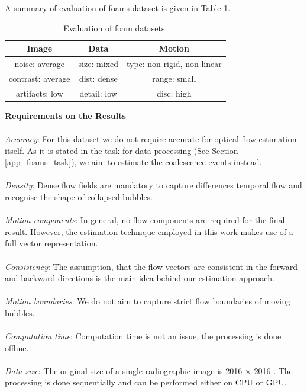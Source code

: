 A summary of evaluation of foams dataset is given in Table \ref{tab:eval_foams}.
\begin{table}[ht] \footnotesize
	\centering
	\caption{Evaluation of foam datasets.}
	\begin{tabular}{ccc}
		\toprule
		\textbf{Image} & \textbf{Data}   & \textbf{Motion}   \\ 
		\midrule
		\cellcolor{norm} noise: average         & \cellcolor{bad} size:  mixed  & \cellcolor{bad}type: non-rigid, non-linear    \\ 
		\cellcolor{norm} contrast: average      & \cellcolor{bad} dist: dense    & \cellcolor{good} range: small  \\ 
		\cellcolor{norm} artifacts: low          & \cellcolor{bad} detail: low  &  \cellcolor{bad} disc: high   \\ 
		\bottomrule
	\end{tabular}
	\label{tab:eval_foams}%
\end{table}


\textbf{Requirements on the Results}
\\
\\
\textit{Accuracy}: For this dataset we do not require accurate for optical flow estimation itself. As it is stated in the task for data processing (See Section \ref{app_foams_task}), we aim to estimate the coalescence events instead.
\\
\\
\textit{Density}: Dense flow fields are mandatory to capture differences temporal flow and recognise the shape of collapsed bubbles. 
\\
\\
\textit{Motion components}: In general, no flow components are required for the final result. However, the estimation technique employed in this work makes use of a full vector representation.
\\
\\
\textit{Consistency}: The assumption, that the flow vectors are consistent in the forward and backward directions is the main idea behind our estimation approach.
\\
\\
\textit{Motion boundaries}: We do not aim to capture strict flow boundaries of moving bubbles.
\\
\\
\textit{Computation time}: Computation time is not an issue, the processing is done offline.
\\
\\
\textit{Data size}: The original size of a single radiographic image is 2016 $\times$ 2016 . The processing is done sequentially and can be performed either on CPU or GPU.  


